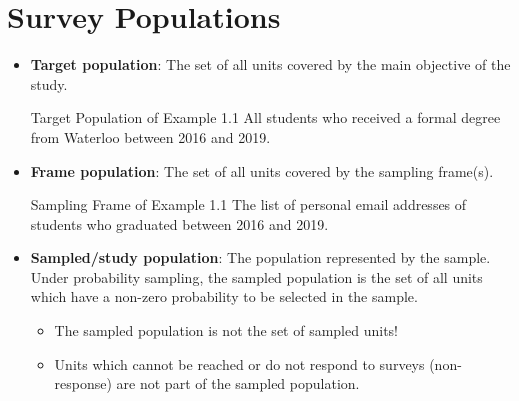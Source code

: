 \documentclass[oneside]{book}\usepackage[]{graphicx}\usepackage[svgnames]{xcolor}
\begin{document}
\section*{Survey Populations}
\begin{Regular}{}
      \begin{itemize}
            \item \textbf{Target population}: The set of all units covered by the main
                  objective of the study.
                  \begin{Example}{Target Population of Example 1.1}
                        All students who received a formal degree from Waterloo
                        between 2016 and 2019.
                  \end{Example}
            \item \textbf{Frame population}: The set of all units covered by the
                  sampling frame(s).
                  \begin{Example}{Sampling Frame of Example 1.1}
                        The list of personal email addresses of
                        students who graduated between 2016 and 2019.
                  \end{Example}
            \item \textbf{Sampled/study population}:
                  The population represented by the sample. Under probability sampling, the
                  sampled population is the set of all units which have a non-zero
                  probability to be selected in the sample.
                  \begin{itemize}
                        \item The sampled population is not the set of sampled units!
                        \item Units which cannot be reached or do not respond to surveys
                              (non-response) are not part of the sampled population.
                  \end{itemize}
      \end{itemize}
\end{Regular}
\end{document}
